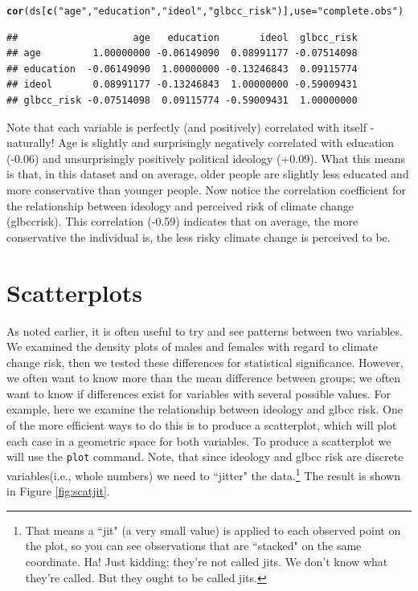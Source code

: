 \documentclass[11pt,openany]{book}\usepackage[]{graphicx}\usepackage[]{color}
\makeatletter
\newcommand{\hlstr}[1]{\textcolor[rgb]{0.192,0.494,0.8}{#1}}%
\newcommand{\hlstd}[1]{\textcolor[rgb]{0.345,0.345,0.345}{#1}}%
\newcommand{\hlkwc}[1]{\textcolor[rgb]{0.333,0.667,0.333}{#1}}%
\newcommand{\hlkwd}[1]{\textcolor[rgb]{0.737,0.353,0.396}{\textbf{#1}}}%
\newenvironment{kframe}{%
 \def\at@end@of@kframe{}%
 \ifinner\ifhmode%
  \def\at@end@of@kframe{\end{minipage}}%
  \begin{minipage}{\columnwidth}%
 \fi\fi%
 \def\FrameCommand##1{\hskip\@totalleftmargin \hskip-\fboxsep
 \colorbox{shadecolor}{##1}\hskip-\fboxsep
     \hskip-\linewidth \hskip-\@totalleftmargin \hskip\columnwidth}%
 \MakeFramed {\advance\hsize-\width
   \@totalleftmargin\z@ \linewidth\hsize
   \@setminipage}}%
 {\par\unskip\endMakeFramed%
 \at@end@of@kframe}
\newenvironment{knitrout}{}{} %
\renewenvironment{knitrout}{\begin{singlespace}}{\end{singlespace}} %
\makeatother
\begin{document}
\begin{knitrout}
\color{fgcolor}\begin{kframe}
\begin{alltt}
\hlkwd{cor}\hlstd{(ds[}\hlkwd{c}\hlstd{(}\hlstr{"age"}\hlstd{,} \hlstr{"education"}\hlstd{,} \hlstr{"ideol"}\hlstd{,} \hlstr{"glbcc_risk"}\hlstd{)],} \hlkwc{use} \hlstd{=} \hlstr{"complete.obs"}\hlstd{)}
\end{alltt}
\begin{verbatim}
##                    age   education       ideol  glbcc_risk
## age         1.00000000 -0.06149090  0.08991177 -0.07514098
## education  -0.06149090  1.00000000 -0.13246843  0.09115774
## ideol       0.08991177 -0.13246843  1.00000000 -0.59009431
## glbcc_risk -0.07514098  0.09115774 -0.59009431  1.00000000
\end{verbatim}
\end{kframe}
\end{knitrout}

Note that each variable is perfectly (and positively) correlated with itself - naturally! Age is slightly and surprisingly negatively correlated with education (-0.06) and unsurprisingly positively political ideology (+0.09). What this means is that, in this dataset and on average, older people are slightly less educated and more conservative than younger people. Now notice the correlation coefficient for the relationship between ideology and perceived risk of climate change (glbccrisk). This correlation (-0.59) indicates that on average, the more conservative the individual is, the less risky climate change is perceived to be.



\section{Scatterplots}

As noted earlier, it is often useful to try and see patterns between two variables. We examined the density plots of males and females with regard to climate change risk, then we tested these differences for statistical significance. However, we often want to know more than the mean difference between groups; we often want to know if differences exist for variables with several possible values. For example, here we examine the relationship between ideology and glbcc risk. One of the more efficient ways to do this is to produce a scatterplot, which will plot each case in a geometric space for both variables. To produce a scatterplot we will use the \texttt{plot} command. Note, that since ideology and glbcc risk are discrete variables(i.e., whole numbers) we need to ``jitter" the data.\footnote{That means a ``jit" (a very small value) is applied to each observed point on the plot, so
you can see observations that are ``stacked" on the same coordinate. Ha! Just kidding; they're not called jits. We don't know what they're called. But they ought to be called jits.} The result is shown in Figure \ref{fig:scatjit}.  
\end{document}
